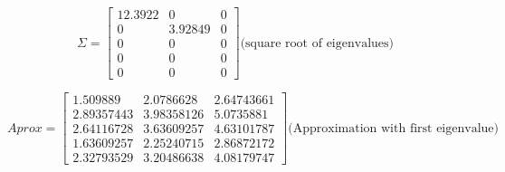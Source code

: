 \documentclass[12pt]{report}
\begin{document}
\[
\Sigma =
\begin{bmatrix}
12.3922 & 0 & 0 \\
0 & 3.92849 & 0 \\
0 & 0 & 0 \\
0 & 0 & 0 \\
0 & 0 & 0
\end{bmatrix}
\text{(square root of eigenvalues)}
\]



\[
Aprox =
\begin{bmatrix}
1.509889 & 2.0786628 & 2.64743661 \\
2.89357443 & 3.98358126 & 5.0735881 \\
2.64116728 & 3.63609257 & 4.63101787 \\
1.63609257 & 2.25240715 & 2.86872172 \\
2.32793529 & 3.20486638 & 4.08179747
\end{bmatrix}
\text{(Approximation with first eigenvalue)}
\]
\end{document}
